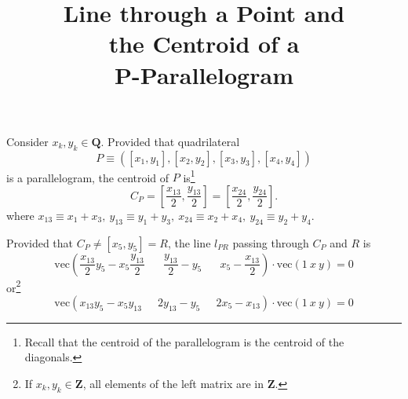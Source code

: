\documentclass{article}
\title{Line through a Point and\\ the Centroid of a\\ P-Parallelogram}
\begin{document}
\maketitle
\noindent
Consider $x_k, y_k \in \mathbf{Q}$.
Provided that quadrilateral
\[
P \equiv ([x_1, y_1], [x_2, y_2], [x_3, y_3], [x_4, y_4])
\]
is a parallelogram, the centroid of $P$ is\footnote{Recall
that the centroid of the parallelogram is the centroid of the diagonals.}
\[
C_P =
\left[ \frac{x_{13}}{2}, \frac{y_{13}}{2} \right] =
\left[ \frac{x_{24}}{2}, \frac{y_{24}}{2} \right] .
\]
where
$x_{13} \equiv x_1 + x_3,\ y_{13} \equiv y_1 + y_3,\
x_{24} \equiv x_2 + x_4,\ y_{24} \equiv y_2 + y_4$.

Provided that $C_P \ne [x_5, y_5] = R$,
the line $l_{PR}$ passing through $C_P$ and $R$ is
\[
\mathrm{vec}(
\frac{x_{13}}{2} y_5 - x_5 \frac{y_{13}}{2}\
\phantom{-}\ \frac{y_{13}}{2} - y_5\
\phantom{-}\ x_5 - \frac{x_{13}}{2}
)
\cdot
\mathrm{vec}(1\ x\ y)=0
\]
or\footnote{If
$x_k, y_k \in \mathbf{Z}$,
all elements of the left matrix are in $\mathbf{Z}$.}
\[
\mathrm{vec}(
x_{13}y_{5} - x_{5}y_{13}
\phantom{-}\ 2 y_{13} - y_{5}
\phantom{-}\ 2 x_{5} - x_{13}
)
\cdot \mathrm{vec}(1\ x\ y)=0
\]
\end{document}
